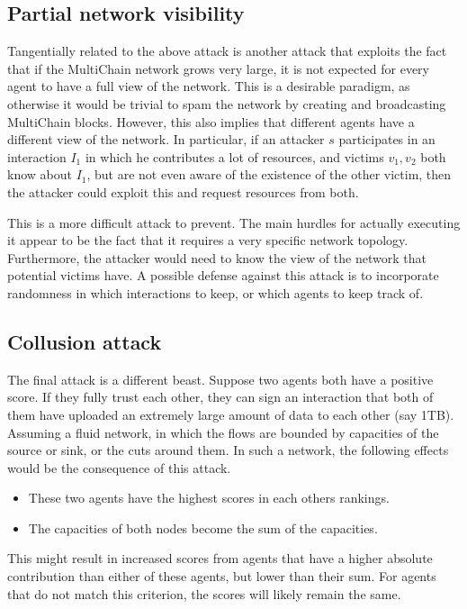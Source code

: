 \documentclass[a4paper,11pt]{book}
\theoremstyle{definition}
\begin{document}
\subsection{Partial network visibility}

Tangentially related to the above attack is another attack that exploits the fact that if the MultiChain
network grows very large, it is not expected for every agent to have a full view of the network. This
is a desirable paradigm, as otherwise it would be trivial to spam the network by creating and broadcasting
MultiChain blocks. However, this also implies that different agents have a different view of the network.
In particular, if an attacker $s$ participates in an interaction $I_1$ in which he contributes a lot
of resources, and victims $v_1, v_2$ both know about $I_1$, but are not even aware of the existence of
the other victim, then the attacker could exploit this and request resources from both. 

This is a more difficult attack to prevent. The main hurdles for actually executing it appear to be
the fact that it requires a very specific network topology. Furthermore, the attacker would need to
know the view of the network that potential victims have. A possible defense against this attack is
to incorporate randomness in which interactions to keep, or which agents to keep track of.

\subsection{Collusion attack}

The final attack is a different beast. Suppose two agents both have a positive score. If they 
fully trust each other, they can sign an interaction that both of them have uploaded an extremely large
amount of data to each other (say 1TB). Assuming a fluid network,
in which the flows are bounded by capacities of the source or sink, or the cuts around them.
In such a network, the following effects would be the consequence of this attack.

\begin{itemize}
    \item These two agents have the highest scores in each others rankings. 
    \item The capacities of both nodes become the sum of the capacities.
\end{itemize}

This might result in increased scores from agents that have a higher absolute contribution
than either of these agents, but lower than their sum. For agents that do not match this
criterion, the scores will likely remain the same.
\end{document}

